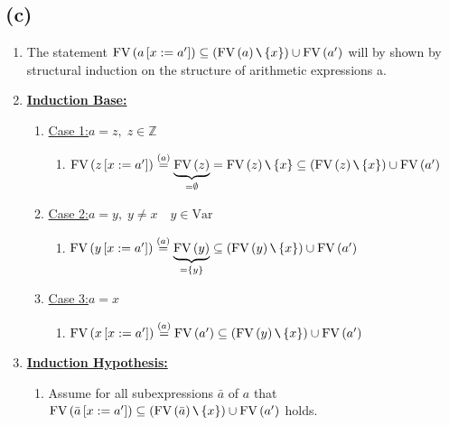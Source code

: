 \documentclass[12pt]{scrartcl}
\newcommand{\FV}{\text{FV}}
\begin{document}
	\subsection*{(c)}
	
	\begin{enumerate}
		\item[] The statement $\FV\left(a\left[x:=a'\right]\right)\subseteq \left(\FV\left(a\right)\verb|\|\left\{x\right\}\right)\cup \FV\left(a'\right)$ will by shown by structural induction on the structure of arithmetic expressions a.
		\item[] \underline{\textbf{Induction Base:}}
		\begin{enumerate}
			\item[] \underline{Case 1:}\quad $a=z,\; z\in\mathbb{Z}$
			\begin{enumerate}
				\item[] $\FV\left(z\left[x:=a'\right]\right) \overset{\left(a\right)}{=}\underbrace{\FV\left(z\right)}_{=\emptyset}=\FV\left(z\right)\verb|\|\left\{x\right\}\subseteq\left(\FV\left(z\right)\verb|\|\left\{x\right\}\right)\cup \FV\left(a'\right)$
			\end{enumerate}
			\item[] \underline{Case 2:}\quad $a=y,\; y\neq x\quad y\in \text{Var}$
			\begin{enumerate}
				\item[] $\FV\left(y\left[x:=a'\right]\right)\overset{\left(a\right)}{=}\underbrace{\FV\left(y\right)}_{=\left\{y\right\}}\subseteq\left(\FV\left(y\right)\verb|\|\left\{x\right\}\right)\cup \FV\left(a'\right)$
			\end{enumerate}
			\item[] \underline{Case 3:}\quad $a=x$
			\begin{enumerate}
				\item[] $\FV\left(x\left[x:=a'\right]\right)\overset{\left(a\right)}{=}\FV\left(a'\right)\subseteq\left(\FV\left(y\right)\verb|\|\left\{x\right\}\right)\cup \FV\left(a'\right)$
			\end{enumerate}
		\end{enumerate}
		\newpage
		\item[] \underline{\textbf{Induction Hypothesis:}}
		\begin{enumerate}
			\item[] Assume for all subexpressions $\bar{a}$ of $a$ that\\ $\FV\left(\bar{a}\left[x:=a'\right]\right)\subseteq\left(\FV\left(\bar{a}\right)\verb|\|\left\{x\right\}\right)\cup \FV\left(a'\right)$ holds.

\end{enumerate}
\end{enumerate}
\end{document}
